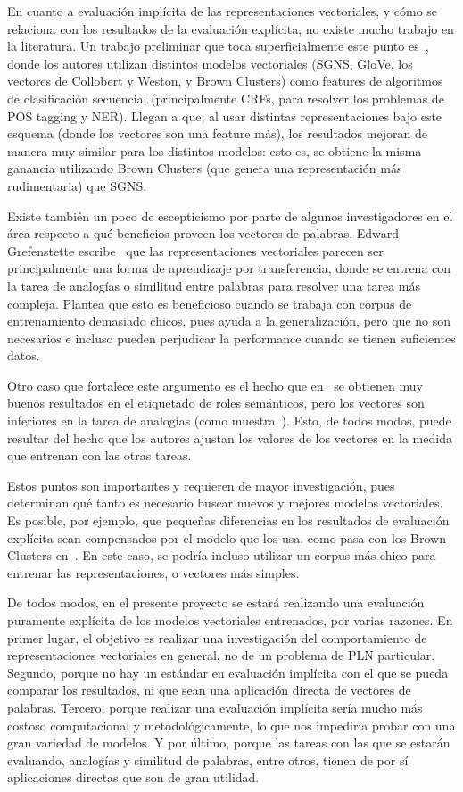 En cuanto a evaluación implícita de las representaciones vectoriales, y cómo se relaciona con los
resultados de la evaluación explícita, no existe mucho trabajo en la literatura. Un trabajo
preliminar que toca superficialmente este punto es~\cite{Qu2015}, donde los autores utilizan
distintos modelos vectoriales (SGNS, GloVe, los vectores de Collobert y Weston, y Brown Clusters)
como features de algoritmos de clasificación secuencial (principalmente CRFs, para resolver los
problemas de POS tagging y NER). Llegan a que, al usar distintas representaciones bajo este esquema
(donde los vectores son una feature más), los resultados mejoran de manera muy similar para los
distintos modelos: esto es, se obtiene la misma ganancia utilizando Brown Clusters (que genera una
representación más rudimentaria) que SGNS\@.

Existe también un poco de escepticismo por parte de algunos investigadores en el área respecto a qué
beneficios proveen los vectores de palabras. Edward Grefenstette escribe~\cite{Reddit2016} que las
representaciones vectoriales parecen ser principalmente una forma de aprendizaje por transferencia,
donde se entrena con la tarea de analogías o similitud entre palabras para resolver una tarea más
compleja. Plantea que esto es beneficioso cuando se trabaja con corpus de entrenamiento demasiado
chicos, pues ayuda a la generalización, pero que no son necesarios e incluso pueden perjudicar la
performance cuando se tienen suficientes datos.

Otro caso que fortalece este argumento es el hecho que en~\cite{CollobertWeston2008} se obtienen muy
buenos resultados en el etiquetado de roles semánticos, pero los vectores son inferiores en la tarea
de analogías (como muestra~\cite{Mikolov2013a}). Esto, de todos modos, puede resultar del hecho que
los autores ajustan los valores de los vectores en la medida que entrenan con las otras tareas.

Estos puntos son importantes y requieren de mayor investigación, pues determinan qué tanto es
necesario buscar nuevos y mejores modelos vectoriales. Es posible, por ejemplo, que pequeñas
diferencias en los resultados de evaluación explícita sean compensados por el modelo que los usa,
como pasa con los Brown Clusters en~\cite{Qu2015}. En este caso, se podría incluso utilizar un
corpus más chico para entrenar las representaciones, o vectores más simples.


De todos modos, en el presente proyecto se estará realizando una evaluación puramente explícita de
los modelos vectoriales entrenados, por varias razones. En primer lugar, el objetivo es realizar una
investigación del comportamiento de representaciones vectoriales en general, no de un problema de
PLN particular. Segundo, porque no hay un estándar en evaluación implícita con el que se pueda
comparar los resultados, ni que sean una aplicación directa de vectores de palabras. Tercero, porque
realizar una evaluación implícita sería mucho más costoso computacional y metodológicamente, lo que
nos impediría probar con una gran variedad de modelos. Y por último, porque las tareas con las que
se estarán evaluando, analogías y similitud de palabras, entre otros, tienen de por sí aplicaciones
directas que son de gran utilidad.


